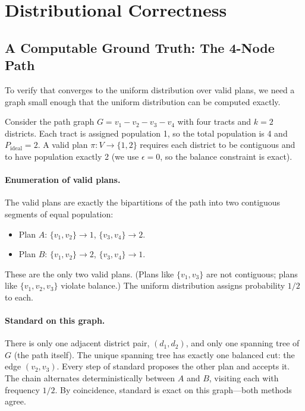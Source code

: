 \section{Distributional Correctness}
\label{sec:distributional}

\subsection{A Computable Ground Truth: The 4-Node Path}

To verify that \fr{} converges to the uniform distribution over valid plans,
we need a graph small enough that the uniform distribution can be computed
exactly.

Consider the path graph $G = v_1 - v_2 - v_3 - v_4$ with four tracts and
$k = 2$ districts.
Each tract is assigned population 1, so the total population is 4 and
$P_{\mathrm{ideal}} = 2$.
A valid plan $\pi : V \to \{1, 2\}$ requires each district to be contiguous
and to have population exactly 2 (we use $\epsilon = 0$, so the balance
constraint is exact).

\paragraph{Enumeration of valid plans.}
The valid plans are exactly the bipartitions of the path into two contiguous
segments of equal population:
\begin{itemize}
  \item Plan $A$: $\{v_1, v_2\} \to 1$, $\{v_3, v_4\} \to 2$.
  \item Plan $B$: $\{v_1, v_2\} \to 2$, $\{v_3, v_4\} \to 1$.
\end{itemize}
These are the only two valid plans.
(Plans like $\{v_1, v_3\}$ are not contiguous; plans like $\{v_1, v_2, v_3\}$
violate balance.)
The uniform distribution assigns probability $1/2$ to each.

\paragraph{Standard \recom{} on this graph.}
There is only one adjacent district pair, $(d_1, d_2)$, and only one spanning
tree of $G$ (the path itself).
The unique spanning tree has exactly one balanced cut: the edge $(v_2, v_3)$.
Every step of standard \recom{} proposes the other plan and accepts it.
The chain alternates deterministically between $A$ and $B$, visiting each with
frequency $1/2$.
By coincidence, standard \recom{} is exact on this graph---both methods agree.

